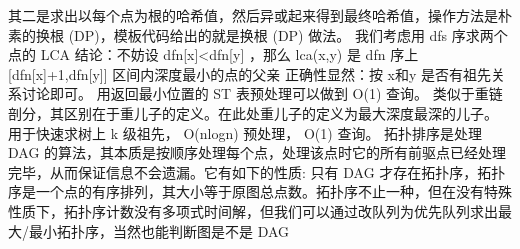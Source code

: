 {}其二是求出以每个点为根的哈希值，然后异或起来得到最终哈希值，操作方法是朴素的换根 (DP)，模板代码给出的就是换根 (DP) 做法。\markdownRendererInterblockSeparator
{}\markdownRendererInterblockSeparator
{}
\markdownRendererSectionEnd \markdownRendererSectionBegin
{}\markdownRendererInterblockSeparator
{}我们考虑用\markdownRendererDollarSign{} dfs \markdownRendererDollarSign{}序求两个点的\markdownRendererDollarSign{} LCA \markdownRendererDollarSign{}\markdownRendererParagraphSeparator
{}结论：不妨设\markdownRendererDollarSign{} dfn[x]<dfn[y] \markdownRendererDollarSign{}，那么\markdownRendererDollarSign{} lca(x,y) \markdownRendererDollarSign{}是\markdownRendererDollarSign{} dfn \markdownRendererDollarSign{}序上\markdownRendererDollarSign{} [dfn[x]+1,dfn[y]] \markdownRendererDollarSign{}区间内深度最小的点的父亲\markdownRendererParagraphSeparator
{}正确性显然：按\markdownRendererDollarSign{} x和y \markdownRendererDollarSign{}是否有祖先关系讨论即可。\markdownRendererParagraphSeparator
{}用返回最小位置的\markdownRendererDollarSign{} ST \markdownRendererDollarSign{}表预处理可以做到\markdownRendererDollarSign{} O(1) \markdownRendererDollarSign{}查询。\markdownRendererInterblockSeparator
{}\markdownRendererInterblockSeparator
{}
\markdownRendererSectionEnd \markdownRendererSectionBegin
{}\markdownRendererInterblockSeparator
{}类似于重链剖分，其区别在于重儿子的定义。在此处重儿子的定义为最大深度最深的儿子。\markdownRendererParagraphSeparator
{}用于快速求树上\markdownRendererDollarSign{} k \markdownRendererDollarSign{}级祖先，\markdownRendererDollarSign{} O(nlogn) \markdownRendererDollarSign{}预处理，\markdownRendererDollarSign{} O(1) \markdownRendererDollarSign{}查询。\markdownRendererInterblockSeparator
{}\markdownRendererInterblockSeparator
{}
\markdownRendererSectionEnd 
\markdownRendererSectionEnd \markdownRendererSectionBegin
{}\markdownRendererInterblockSeparator
{}拓扑排序是处理\markdownRendererDollarSign{} DAG \markdownRendererDollarSign{}的算法，其本质是按顺序处理每个点，处理该点时它的所有前驱点已经处理完毕，从而保证信息不会遗漏。它有如下的性质:\markdownRendererParagraphSeparator
{}只有\markdownRendererDollarSign{} DAG \markdownRendererDollarSign{}才存在拓扑序，拓扑序是一个点的有序排列，其大小等于原图总点数。拓扑序不止一种，但在没有特殊性质下，拓扑序计数没有多项式时间解，但我们可以通过改队列为优先队列求出最大/最小拓扑序，当然也能判断图是不是\markdownRendererDollarSign{} DAG \markdownRendererDollarSign{}\markdownRendererParagraphSeparator
